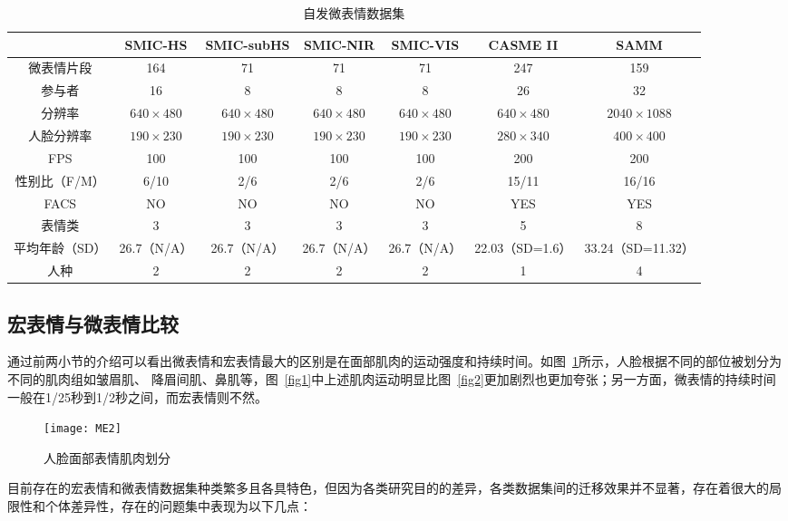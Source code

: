 \begin{table}[!htbp]
  \renewcommand\arraystretch{1.5}
  \centering
  \caption{自发微表情数据集}
  \label{tab3}
  \footnotesize%
  \setlength{\tabcolsep}{4pt}%
    \begin{tabular}{c|cccccc}
    \hline
     & SMIC-HS & SMIC-subHS & SMIC-NIR & SMIC-VIS & CASME II & SAMM \\ \hline
    微表情片段 & 164 & 71 & 71 & 71 & 247 & 159 \\
    参与者 & 16 & 8 & 8 & 8 & 26 & 32 \\
    分辨率 & $640\times480$ & $640\times480$ & $640\times480$ & $640\times480$ & $640\times480$ & $2040\times1088$ \\
    人脸分辨率 & $190\times230$ & $190\times230$ & $190\times230$ & $190\times230$ & $280\times340$ & $400\times400$ \\
    FPS & 100 & 100 & 100 & 100 & 200 & 200 \\
    性别比（F/M） & 6/10 & 2/6 & 2/6 & 2/6 & 15/11 & 16/16 \\
    FACS & NO & NO & NO & NO & YES & YES \\
    表情类 & 3 & 3 & 3 & 3 & 5 & 8 \\
    平均年龄（SD） & 26.7（N/A） & 26.7（N/A） & 26.7（N/A） & 26.7（N/A） & 22.03（SD=1.6） & 33.24（SD=11.32） \\
    人种 & 2 & 2 & 2 & 2 & 1 & 4 \\ \hline
    \end{tabular}
\end{table}

\subsection{宏表情与微表情比较}

通过前两小节的介绍可以看出微表情和宏表情最大的区别是在面部肌肉的运动强度和持续时间。如图~\ref{fig4}所示，人脸根据不同的部位被划分为不同的肌肉组如皱眉肌、
降眉间肌、鼻肌等，图~\ref{fig1}中上述肌肉运动明显比图~\ref{fig2}更加剧烈也更加夸张；另一方面，微表情的持续时间一般在1/25秒到1/2秒之间，而宏表情则不然。

\begin{figure}[!htbp]
    \centering
    \texttt{[image: ME2]}
    \caption{人脸面部表情肌肉划分}
    \label{fig4}
\end{figure}

目前存在的宏表情和微表情数据集种类繁多且各具特色，但因为各类研究目的的差异，各类数据集间的迁移效果并不显著，存在着很大的局限性和个体差异性，存在的问题集中表现为以下几点：

